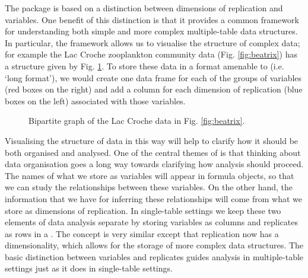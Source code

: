 \documentclass[a4paper]{report}
\numberwithin{exercise}{section}
\begin{document}
\begin{article}
The  package is based on a distinction between dimensions of replication and variables.  One benefit of this distinction is that it provides a common framework for understanding both simple and more complex multiple-table data structures.  In particular, the framework allows us to visualise the structure of complex data; for example the Lac Croche zooplankton community data (Fig. \ref{fig:beatrix}) \citep{CantinEtAl2011} has a structure given by Fig. \ref{fig:bipartitebeatrix}.  To store these data in a format amenable to  (i.e. `long format'), we would create one data frame for each of the groups of variables (red boxes on the right) and add a column for each dimension of replication (blue boxes on the left) associated with those variables.

\begin{figure}
\vspace{0.1cm}
\caption{Bipartite graph of the Lac Croche data in Fig. \ref{fig:beatrix}.} 
\label{fig:bipartitebeatrix}
\end{figure}

Visualising the structure of data in this way will help to clarify how it should be both organised and analysed.  One of the central themes of  is that thinking about data organisation goes a long way towards clarifying how analysis should proceed.  The names of what we store as variables will appear in formula objects, so that we can study the relationships between these variables.  On the other hand, the information that we have for inferring these relationships will come from what we store as dimensions of replication.  In single-table settings we keep these two elements of data analysis separate by storing variables as columns and replicates as rows in a .  The  concept is very similar except that replication now has a dimensionality, which allows for the storage of more complex data structures.  The basic distinction between variables and replicates guides analysis in multiple-table settings just as it does in single-table settings.


\end{article}
\end{document}
